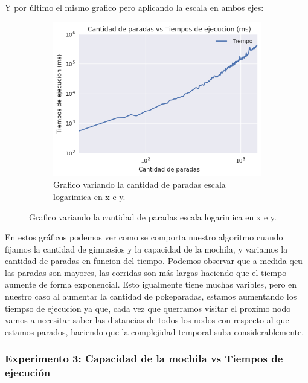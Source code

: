 Y por último el mismo grafico pero aplicando la escala en ambos ejes:

\begin{figure}[H]
  \begin{center}
   \begin{subfigure}[b]{0.70\textwidth}	
        \includegraphics[width=\textwidth]{img/ejercicio2/losPosta/grafico_con_2_logs.png}
        \caption{Grafico variando la cantidad de paradas escala logarimica en x e y.}
        \label{fig: ejercicio1_ejemplo_camino1_2}
   \end{subfigure}
  \end{center}
\end{figure}

En estos gráficos podemos ver como se comporta nuestro algoritmo cuando fijamos la cantidad de gimnasios y la capacidad de la mochila, y variamos la cantidad de paradas en funcion del tiempo.
Podemos observar que a medida qeu las paradas son mayores, las corridas son más largas haciendo que el tiempo aumente de forma exponencial.
Esto igualmente tiene muchas varibles, pero en nuestro caso al aumentar la cantidad de pokeparadas, estamos aumentando los tiempso de ejecucion ya que, cada vez que querramos visitar el proximo nodo
vamos a necesitar saber las distancias de todos los nodos con respecto al que estamos parados, haciendo que la complejidad temporal suba considerablemente.

\subsubsection{Experimento 3: Capacidad de la mochila vs Tiempos de ejecución}

